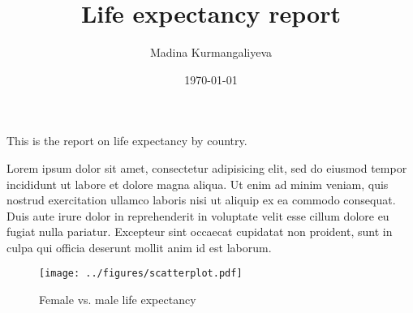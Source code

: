 \documentclass[10pt,a4paper]{article}
\title{Life expectancy report}
\author{Madina Kurmangaliyeva}
\date{\today}
\begin{document}
\maketitle

This is the report on life expectancy by country.

Lorem ipsum dolor sit amet, consectetur adipisicing elit, sed do eiusmod
tempor incididunt ut labore et dolore magna aliqua. Ut enim ad minim veniam,
quis nostrud exercitation ullamco laboris nisi ut aliquip ex ea commodo
consequat. Duis aute irure dolor in reprehenderit in voluptate velit esse
cillum dolore eu fugiat nulla pariatur. Excepteur sint occaecat cupidatat non
proident, sunt in culpa qui officia deserunt mollit anim id est laborum.

\begin{figure}[hb]
	\centering
	\texttt{[image: ../figures/scatterplot.pdf]}
	\caption{Female vs. male life expectancy}
	\label{fig:figure_label}
\end{figure}
\end{document}
